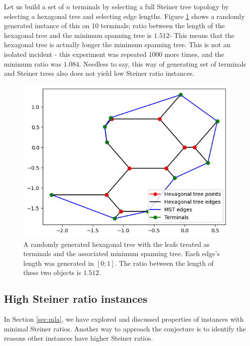 \documentclass{mpaper}
\begin{document}
Let us build a set of $n$ terminals by selecting a full Steiner tree topology by selecting a hexagonal tree and selecting edge lengths. Figure \ref{fig:17} shows a randomly generated instance of this on 10 terminals; ratio between the length of the hexagonal tree and the minimum spanning tree is $1.512$- This means that the hexagonal tree is actually longer the minimum spanning tree. This is not an isolated incident - this experiment was repeated 1000 more times, and the minimum ratio was $1.084$. Needless to say, this way of generating set of terminals and Steiner trees also does not yield low Steiner ratio instances.

\begin{figure}[h!]
  \begin{center}
  \includegraphics[scale=0.5]{plot15.png}
  \end{center}
  \caption{\label{fig:17} A randomly generated hexagonal tree with the leafs treated as terminals and the associated minimum spanning tree. Each edge's length was generated in $[0;1]$. The ratio between the length of these two objects is $1.512$.}
\end{figure}

\subsection{High Steiner ratio instances}
In Section \ref{sec:mla}, we have explored and discussed properties of instances with minimal Steiner ratios. Another way to approach the conjecture is to identify the reasons other instances have higher Steiner ratios.
\end{document}
